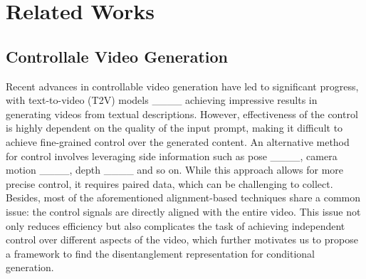 \section{Related Works}
\vspace{-0.1cm}
\subsection{Controllale Video Generation}
Recent advances in controllable video generation have led to significant progress, with text-to-video (T2V) models ____ achieving impressive results in generating videos from textual descriptions. However,
effectiveness of the control is highly dependent on the quality of the input prompt, making it difficult to achieve fine-grained control over the generated content. An alternative method for control involves leveraging side information such as pose ____, camera motion ____, depth ____ and so on. While this approach allows for more precise control, it requires paired data, which can be challenging to collect. 
Besides, most of the aforementioned alignment-based techniques share a common issue: the control signals are directly aligned with the entire video. This issue not only reduces efficiency but also complicates the task of achieving independent control over different aspects of the video, which further motivates us to propose a framework to find the disentanglement representation for conditional generation.



